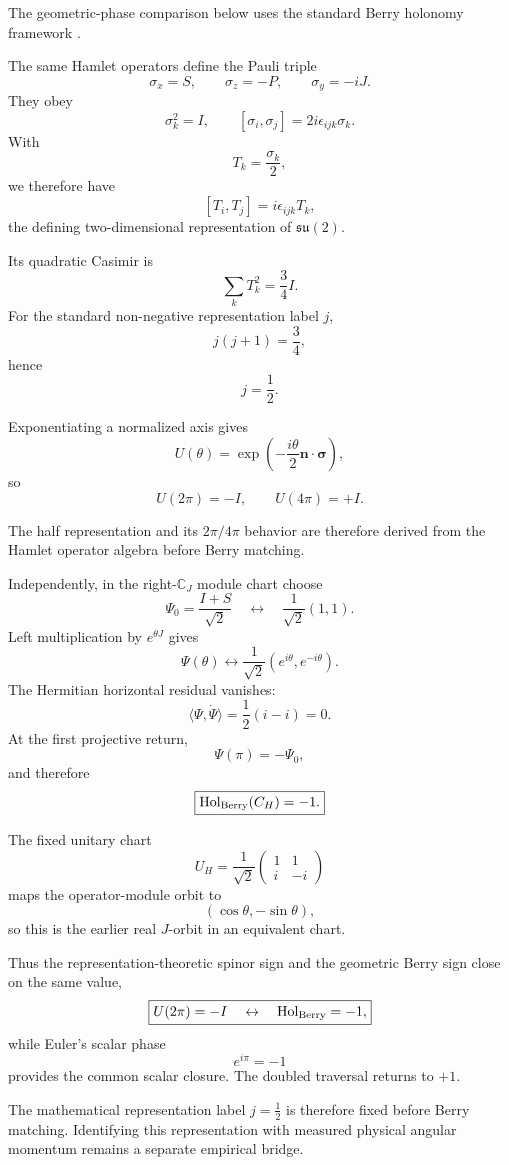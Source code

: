 \documentclass[11pt]{article}
\begin{document}
The geometric-phase comparison below uses the standard Berry holonomy
framework \cite{Berry1984}.

The same Hamlet operators define the Pauli triple
\[
\sigma_x=S,
\qquad
\sigma_z=-P,
\qquad
\sigma_y=-iJ.
\]
They obey
\[
\sigma_k^2=I,
\qquad
[\sigma_i,\sigma_j]
=
2i\epsilon_{ijk}\sigma_k.
\]
With
\[
T_k=\frac{\sigma_k}{2},
\]
we therefore have
\[
\boxed{
[T_i,T_j]
=
i\epsilon_{ijk}T_k,
}
\]
the defining two-dimensional representation of \(\mathfrak{su}(2)\).

Its quadratic Casimir is
\[
\sum_kT_k^2
=
\frac34I.
\]
For the standard non-negative representation label \(j\),
\[
j(j+1)=\frac34,
\]
hence
\[
\boxed{
j=\frac12.
}
\]

Exponentiating a normalized axis gives
\[
U(\theta)
=
\exp\left(
-\frac{i\theta}{2}
\mathbf n\cdot\boldsymbol\sigma
\right),
\]
so
\[
\boxed{
U(2\pi)=-I,
\qquad
U(4\pi)=+I.
}
\]

The half representation and its \(2\pi/4\pi\) behavior are therefore derived
from the Hamlet operator algebra before Berry matching.

Independently, in the right-\(\mathbb C_J\) module chart choose
\[
\Psi_0
=
\frac{I+S}{\sqrt2}
\quad\longleftrightarrow\quad
\frac1{\sqrt2}(1,1).
\]
Left multiplication by \(e^{\theta J}\) gives
\[
\Psi(\theta)
\longleftrightarrow
\frac1{\sqrt2}
\left(
e^{i\theta},
e^{-i\theta}
\right).
\]
The Hermitian horizontal residual vanishes:
\[
\langle\Psi,\dot\Psi\rangle
=
\frac12(i-i)
=
0.
\]
At the first projective return,
\[
\Psi(\pi)=-\Psi_0,
\]
and therefore
\[
\boxed{
\operatorname{Hol}_{\rm Berry}(C_H)=-1.
}
\]

The fixed unitary chart
\[
U_H=
\frac1{\sqrt2}
\begin{pmatrix}
1&1\\
i&-i
\end{pmatrix}
\]
maps the operator-module orbit to
\[
(\cos\theta,-\sin\theta),
\]
so this is the earlier real \(J\)-orbit in an equivalent chart.

Thus the representation-theoretic spinor sign and the geometric Berry sign
close on the same value,
\[
\boxed{
U(2\pi)=-I
\quad\leftrightarrow\quad
\operatorname{Hol}_{\rm Berry}=-1,
}
\]
while Euler's scalar phase
\[
e^{i\pi}=-1
\]
provides the common scalar closure. The doubled traversal returns to \(+1\).

The mathematical representation label \(j=\tfrac12\) is therefore fixed
before Berry matching. Identifying this representation with measured physical
angular momentum remains a separate empirical bridge.
\end{document}
